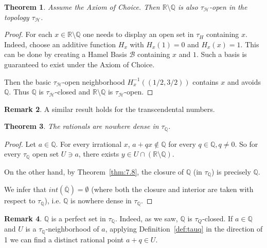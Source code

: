 \documentclass[11pt]{amsart} %
\newtheorem{theorem}{Theorem}[section]
\theoremstyle{definition}
\newtheorem{remark}[theorem]{Remark}
\newcommand{\R}{\mathbb{R}}
\newcommand{\Q}{\mathbb{Q}}
\newcommand{\AD}{\mathcal{H}}
\begin{document}
\begin{theorem}
\label{thm:7.9}
Assume the Axiom of Choice. Then $\mathbb{R}\setminus\mathbb{Q}$ is also $\tau_{\AD}$-open in the topology $\tau_{\AD}$.
\end{theorem}

\begin{proof}
For each $x\in\mathbb{R}\setminus\mathbb{Q}$ one needs to display an open set in $\tau_{H}$ containing $x$. Indeed, choose an additive function $H_{x}$ with $H_{x}(1)=0$ and $H_{x}(x)=1$. This can be done by creating a Hamel Basis $\mathcal{B}$ containing $x$ and $1$. Such a basis is guaranteed to exist under the Axiom of Choice.

Then the basic $\tau_{\AD}$-open neighborhood $H_{x}^{-1}((1/2,3/2))$ contains $x$ and avoids $\mathbb{Q}$. Thus $\mathbb{Q}$ is $\tau_{\AD}$-closed and $\mathbb{R}\setminus\mathbb{Q}$ is $\tau_{\AD}$-open.
\end{proof}

\begin{remark}
\label{rem:7.10}
A similar result holds for the transcendental numbers.
\end{remark}

\begin{theorem}
\label{thm:7.11}
The rationals are nowhere dense in $\tau_{\Q}$.
\end{theorem}

\begin{proof}
Let $a\in \Q$. For every irrational $x$, $a+qx\not \in \Q$ for every $q\in \Q, q\neq 0$. So for every $\tau_{\Q}$ open set $U\ni a$, there exists $y\in U\cap (\R \setminus \Q)$. 

On the other hand, by Theorem~\ref{thm:7.8}, the closure of $\Q$ (in $\tau_{\Q}$) is precisely $\Q$. 

We infer that $int(\overline{\Q})=\emptyset$ (where both the closure and interior are taken with respect to $\tau_{\Q}$), i.e. $\Q$ is nowhere dense in $\tau_{\Q}$. 
\end{proof}

\begin{remark} 
$\Q$ is a perfect set in $\tau_{\Q}$. Indeed, as we saw, $\Q$ is $\tau_{Q}$-closed. If $a\in \Q$ and $U$ is a $\tau_{\Q}$-neighborhood of $a$, applying Definition~\ref{def:tauq} in the direction of 1 we can find a distinct rational point $a+q\in U$. 
\end{remark} 
\end{document}
